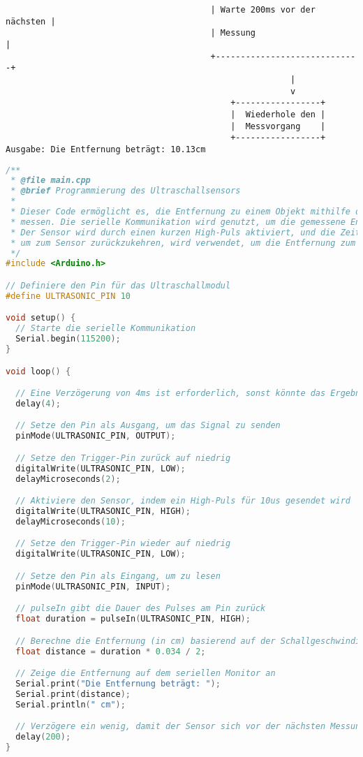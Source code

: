 \documentclass{vorlage-design-main}
\begin{document}
\begin{lstlisting}
                                         | Warte 200ms vor der nächsten |
                                         | Messung                      |
                                         +-----------------------------+
                                                         |
                                                         v
                                             +-----------------+
                                             |  Wiederhole den |
                                             |  Messvorgang    |
                                             +-----------------+
Ausgabe: Die Entfernung beträgt: 10.13cm                                           
\end{lstlisting}

\newpage

\begin{lstlisting}[language={C++}]
/**
 * @file main.cpp
 * @brief Programmierung des Ultraschallsensors
 * 
 * Dieser Code ermöglicht es, die Entfernung zu einem Objekt mithilfe des HC-SR04 Ultraschallsensors zu
 * messen. Die serielle Kommunikation wird genutzt, um die gemessene Entfernung in Zentimetern auszugeben.
 * Der Sensor wird durch einen kurzen High-Puls aktiviert, und die Zeit, die das Echo benötigt, 
 * um zum Sensor zurückzukehren, wird verwendet, um die Entfernung zum Objekt zu berechnen.
 */
#include <Arduino.h>

// Definiere den Pin für das Ultraschallmodul
#define ULTRASONIC_PIN 10

void setup() {
  // Starte die serielle Kommunikation
  Serial.begin(115200);
}

void loop() {

  // Eine Verzögerung von 4ms ist erforderlich, sonst könnte das Ergebnis 0 sein
  delay(4);

  // Setze den Pin als Ausgang, um das Signal zu senden
  pinMode(ULTRASONIC_PIN, OUTPUT);

  // Setze den Trigger-Pin zurück auf niedrig
  digitalWrite(ULTRASONIC_PIN, LOW);
  delayMicroseconds(2);

  // Aktiviere den Sensor, indem ein High-Puls für 10us gesendet wird
  digitalWrite(ULTRASONIC_PIN, HIGH);
  delayMicroseconds(10);

  // Setze den Trigger-Pin wieder auf niedrig
  digitalWrite(ULTRASONIC_PIN, LOW);

  // Setze den Pin als Eingang, um zu lesen
  pinMode(ULTRASONIC_PIN, INPUT);

  // pulseIn gibt die Dauer des Pulses am Pin zurück
  float duration = pulseIn(ULTRASONIC_PIN, HIGH);

  // Berechne die Entfernung (in cm) basierend auf der Schallgeschwindigkeit (340 m/s oder 0,034 cm/us)
  float distance = duration * 0.034 / 2;

  // Zeige die Entfernung auf dem seriellen Monitor an
  Serial.print("Die Entfernung beträgt: ");
  Serial.print(distance);
  Serial.println(" cm");

  // Verzögere ein wenig, damit der Sensor sich vor der nächsten Messung stabilisieren kann
  delay(200);
}
\end{lstlisting}
\end{document}
